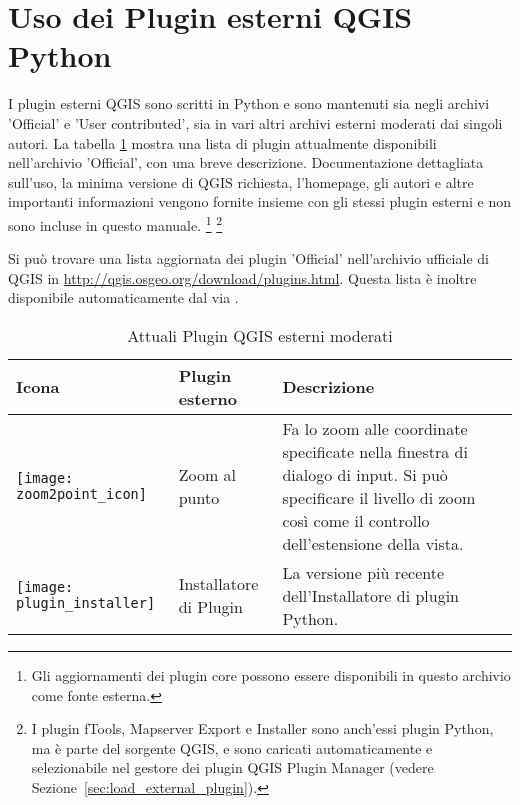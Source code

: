 
\section{Uso dei Plugin esterni QGIS Python}\label{sec:external_plugins}


I plugin esterni QGIS sono scritti in Python e sono mantenuti sia
negli archivi 'Official' e 'User contributed', sia in vari altri archivi esterni 
moderati dai singoli autori. 
La tabella \ref{tab:external_plugins} mostra una lista di plugin attualmente disponibili nell'archivio 'Official', 
con una breve descrizione.
Documentazione dettagliata sull'uso, la minima versione di QGIS richiesta, l'homepage, gli autori 
e altre importanti informazioni vengono fornite insieme con gli stessi plugin esterni 
e non sono incluse in questo manuale.
\footnote{Gli aggiornamenti dei plugin core possono essere
disponibili in questo archivio come fonte esterna.} 
\footnote{I plugin fTools, Mapserver Export e Installer sono anch'essi plugin Python, 
ma è parte del sorgente QGIS, e sono caricati automaticamente e selezionabile nel gestore dei 
plugin QGIS Plugin Manager (vedere Sezione~\ref{sec:load_external_plugin}).}

Si può trovare una lista aggiornata dei plugin 'Official' nell'archivio ufficiale di QGIS 
in \url{http://qgis.osgeo.org/download/plugins.html}. Questa lista è inoltre disponibile 
automaticamente dal  via . 

\begin{table}[H]
\centering
\caption{Attuali Plugin QGIS esterni moderati}\label{tab:external_plugins}\medskip
\small
 \begin{tabular}{|l|l|p{4in}|}
\hline \textbf{Icona} & \textbf{Plugin esterno} & \textbf{Descrizione}\\
\hline
\texttt{[image: zoom2point\_icon]}
 & Zoom al punto \index{plugin!zoom al punto} & Fa lo zoom alle coordinate 
specificate nella finestra di dialogo di input. Si può specificare il livello di zoom così come 
il controllo dell'estensione della vista.\\
\hline
\texttt{[image: plugin\_installer]}
 & Installatore di Plugin \index{plugins!installatore plugin Python} & La versione più recente dell'Installatore di plugin Python.\\
\hline

\end{tabular}
\end{table}

